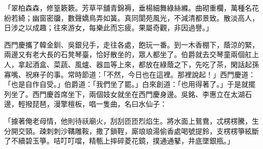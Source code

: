 \begin{showcontents}{}
「翠柏森森，修篁簌簌。芳草平舖青錦褥，垂楊細舞綠絲縧。曲砌重欄，萬種名花紛若綺；幽窗密牖，數聲嬌鳥弄如簧。真同閬苑風光，不減清都景致。散淡高人，日涉之以成趣；往來游女，每樂此而忘疲。果屬奇觀，非因過譽。」

西門慶攜了韓金釧、吳銀兒手，走往各處，飽玩一番。到一木香棚下，蔭涼的緊，兩邊又有老大長的石凳琴臺，恰好散坐的，眾人都坐了。伯爵就去交琴童兩個舡上人，拿起酒盒、菜蔬、風爐、器皿等上來，都放在綠蔭之下，先吃了茶，閑話起孫寡嘴、祝麻子的事。常時節道：「不然，今日也在這裡。那裡說起！」西門慶道：「也是自作自受。」伯爵道：「我們坐了罷。」白來創道：「也用得著了。」于是就擺列坐了。西門慶首席坐下，兩個妓女就坐在西門慶身邊。吳銘、李惠立在太湖石邊，輕撥琵琶，漫擎檀板，唱一隻曲，名曰水仙子：

「據著俺老母情，他則待祅廟火，刮刮匝匝烈焰生。將水面上鴛鴦，忒楞楞騰，生分開交頸。疎刺刺沙鞲雕鞍，撒了鎖鞓，廝琅琅湯偷香處喝號提鈴，支楞楞箏絃斷了不續碧玉箏。咭叮叮噹，精甎上摔碎菱花鏡，撲通通鼕，井底墜銀瓶。」


\end{showcontents}
